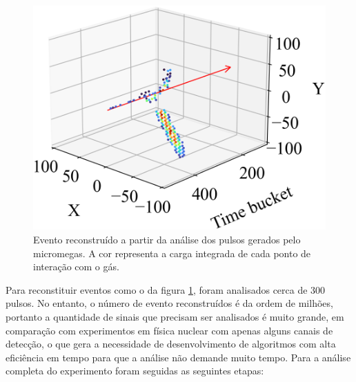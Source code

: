 \documentclass[a4paper,12pt,oneside]{book}
\begin{document}
\begin{figure}[H]
    \centering
    \includegraphics[scale = 0.40]{figs/event_cap_exp.png}
    \caption{Evento reconstruído a partir da análise dos pulsos gerados pelo micromegas. A cor representa a carga integrada de cada ponto de interação com o gás.}
    \label{fig:event_cap_exp}
\end{figure}
\par Para reconstituir eventos como o da figura \ref{fig:event_cap_exp}, foram analisados cerca de 300 pulsos. No entanto, o número de evento reconstruídos é da ordem de milhões, portanto a quantidade de sinais que precisam ser analisados é muito grande, em comparação com experimentos em física nuclear com apenas alguns canais de detecção, o que gera a necessidade de desenvolvimento de algoritmos com alta eficiência em tempo para que a análise não demande muito tempo. Para a análise completa do experimento foram seguidas as seguintes etapas:

\end{document}
